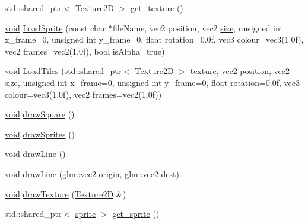 \begin{DoxyCompactItemize}
\item 
std\+::shared\+\_\+ptr$<$ \hyperlink{classTexture2D}{Texture2D} $>$ \hyperlink{classRenderComponent_ad505bc06bf0bcab5f714496b21a331d1}{get\+\_\+texture} ()
\item 
\hyperlink{imgui__impl__opengl3__loader_8h_ac668e7cffd9e2e9cfee428b9b2f34fa7}{void} \hyperlink{classRenderComponent_ac4b28834176234f17223ae6068494175}{Load\+Sprite} (const char $\ast$file\+Name, vec2 position, vec2 \hyperlink{imgui__impl__opengl3__loader_8h_a3d1e3edfcf61ca2d831883e1afbad89e}{size}, unsigned int x\+\_\+frame=0, unsigned int y\+\_\+frame=0, float rotation=0.\+0f, vec3 colour=vec3(1.\+0f), vec2 frames=vec2(1.\+0f), bool is\+Alpha=true)
\item 
\hyperlink{imgui__impl__opengl3__loader_8h_ac668e7cffd9e2e9cfee428b9b2f34fa7}{void} \hyperlink{classRenderComponent_a402d72e1fa9f7d4e21de7790a77b6c95}{Load\+Tiles} (std\+::shared\+\_\+ptr$<$ \hyperlink{classTexture2D}{Texture2D} $>$ \hyperlink{imgui__impl__opengl3__loader_8h_a0b57774cb59b667df4a205ae0b1a50e2}{texture}, vec2 position, vec2 \hyperlink{imgui__impl__opengl3__loader_8h_a3d1e3edfcf61ca2d831883e1afbad89e}{size}, unsigned int x\+\_\+frame=0, unsigned int y\+\_\+frame=0, float rotation=0.\+0f, vec3 colour=vec3(1.\+0f), vec2 frames=vec2(1.\+0f))
\item 
\hyperlink{imgui__impl__opengl3__loader_8h_ac668e7cffd9e2e9cfee428b9b2f34fa7}{void} \hyperlink{classRenderComponent_ab6c080155535c487e32403e4d22683e5}{draw\+Square} ()
\item 
\hyperlink{imgui__impl__opengl3__loader_8h_ac668e7cffd9e2e9cfee428b9b2f34fa7}{void} \hyperlink{classRenderComponent_a8def1d9b9ceda298e79b82fd8b0e5942}{draw\+Sprites} ()
\item 
\hyperlink{imgui__impl__opengl3__loader_8h_ac668e7cffd9e2e9cfee428b9b2f34fa7}{void} \hyperlink{classRenderComponent_a2413b8e4fc53c6f41984b173187577a9}{draw\+Line} ()
\item 
\hyperlink{imgui__impl__opengl3__loader_8h_ac668e7cffd9e2e9cfee428b9b2f34fa7}{void} \hyperlink{classRenderComponent_ac38281dc68e53d796d44dfb7d4c588a4}{draw\+Line} (glm\+::vec2 origin, glm\+::vec2 dest)
\item 
\hyperlink{imgui__impl__opengl3__loader_8h_ac668e7cffd9e2e9cfee428b9b2f34fa7}{void} \hyperlink{classRenderComponent_a3d25a4dc34ed86b6165b985abe8e762b}{draw\+Texture} (\hyperlink{classTexture2D}{Texture2D} \&)
\item 
std\+::shared\+\_\+ptr$<$ \hyperlink{classsprite}{sprite} $>$ \hyperlink{classRenderComponent_a43c12db168ff23056f06b62a88d9cfa4}{get\+\_\+sprite} ()
\end{DoxyCompactItemize}
